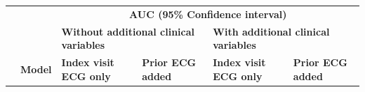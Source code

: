 \documentclass[preprint]{elsarticle}
\begin{document}
\renewcommand{\arraystretch}{1}




\renewcommand{\arraystretch}{1.2}
\begin{table}[H]
  \centering
  \scriptsize
\begin{adjustbox}{center}
\begin{tabular}{@{}llcccc@{}}
  \toprule
  & & \multicolumn{4}{c}{\textbf{AUC (95\% Confidence interval)}} \\
  \cmidrule(lr){3-6}
  & & \multicolumn{2}{l}{\textbf{Without additional clinical variables}} & \multicolumn{2}{l}{\textbf{With additional clinical variables}} \\
  \cmidrule(lr){3-4}\cmidrule(lr){5-6}
  & \multicolumn{1}{l}{\textbf{Model}} & \multicolumn{1}{l}{\textbf{Index visit ECG only}} & \multicolumn{1}{l}{\textbf{Prior ECG added}} & \multicolumn{1}{l}{\textbf{Index visit ECG only}} & \multicolumn{1}{l}{\textbf{Prior ECG added}} \\
  \midrule


\end{tabular}
\end{adjustbox}
\end{table}
\end{document}
